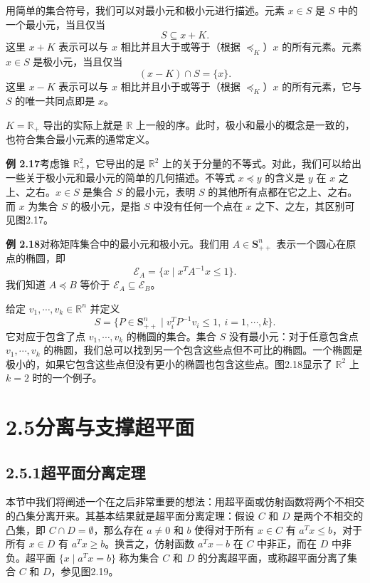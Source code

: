 \documentclass[UTF8,12pt,a4paper,fontset=fandol]{ctexart}
\begin{document}
用简单的集合符号，我们可以对最小元和极小元进行描述。元素 $x\in S$ 是 $S$ 中的一个最小元，当且仅当
\[
  S\subseteq x+K.
\]
这里 $x+K$ 表示可以与 $x$ 相比并且大于或等于（根据 $\preceq_K$）$x$ 的所有元素。元素 $x\in S$ 是极小元，当且仅当
\[
  (x-K)\cap S=\{x\}.
\]
这里 $x-K$ 表示可以与 $x$ 相比并且小于或等于（根据 $\preceq_K$）$x$ 的所有元素，它与 $S$ 的唯一共同点即是 $x$。

$K=\mathbb{R}_+$ 导出的实际上就是 $\mathbb{R}$ 上一般的序。此时，极小和最小的概念是一致的，也符合集合最小元素的通常定义。

\noindent\textbf{例 2.17}\quad 考虑锥 $\mathbb{R}_+^2$，它导出的是 $\mathbb{R}^2$ 上的关于分量的不等式。对此，我们可以给出一些关于极小元和最小元的简单的几何描述。不等式 $x\preceq y$ 的含义是 $y$ 在 $x$ 之上、之右。$x\in S$ 是集合 $S$ 的最小元，表明 $S$ 的其他所有点都在它之上、之右。而 $x$ 为集合 $S$ 的极小元，是指 $S$ 中没有任何一个点在 $x$ 之下、之左，其区别可见图2.17。

\noindent\textbf{例 2.18}\quad 对称矩阵集合中的最小元和极小元。我们用 $A\in\mathbf{S}_{++}^n$ 表示一个圆心在原点的椭圆，即
\[
  \mathcal{E}_A=\{x\mid x^TA^{-1}x\le 1\}.
\]
我们知道 $A\preceq B$ 等价于 $\mathcal{E}_A\subseteq\mathcal{E}_B$。

给定 $v_1,\cdots,v_k\in\mathbb{R}^n$ 并定义
\[
  S=\{P\in\mathbf{S}_{++}^n\mid v_i^TP^{-1}v_i\le 1,\ i=1,\cdots,k\}.
\]
它对应于包含了点 $v_1,\cdots,v_k$ 的椭圆的集合。集合 $S$ 没有最小元：对于任意包含点 $v_1,\cdots,v_k$ 的椭圆，我们总可以找到另一个包含这些点但不可比的椭圆。一个椭圆是极小的，如果它包含这些点但没有更小的椭圆也包含这些点。图2.18显示了 $\mathbb{R}^2$ 上 $k=2$ 时的一个例子。

\section*{2.5\quad 分离与支撑超平面}

\subsection*{2.5.1\quad 超平面分离定理}

本节中我们将阐述一个在之后非常重要的想法：用超平面或仿射函数将两个不相交的凸集分离开来。其基本结果就是超平面分离定理：假设 $C$ 和 $D$ 是两个不相交的凸集，即 $C\cap D=\emptyset$，那么存在 $a\ne 0$ 和 $b$ 使得对于所有 $x\in C$ 有 $a^Tx\le b$，对于所有 $x\in D$ 有 $a^Tx\ge b$。换言之，仿射函数 $a^Tx-b$ 在 $C$ 中非正，而在 $D$ 中非负。超平面 $\{x\mid a^Tx=b\}$ 称为集合 $C$ 和 $D$ 的分离超平面，或称超平面分离了集合 $C$ 和 $D$，参见图2.19。
\end{document}
